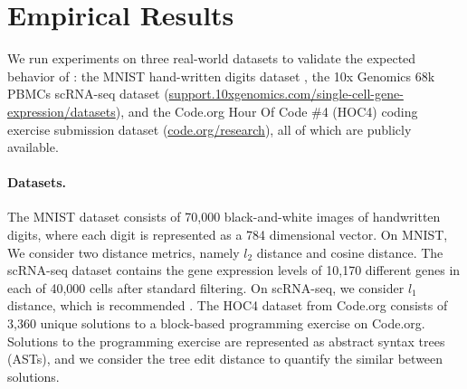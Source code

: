 


\section{Empirical Results \label{sec:exps}}

We run experiments on three real-world datasets to validate the expected behavior of \algnamenospace: the MNIST hand-written digits dataset \cite{lecun1998gradient}, the 10x Genomics 68k PBMCs scRNA-seq dataset \cite{zheng2017massively} (\url{support.10xgenomics.com/single-cell-gene-expression/datasets}), and the Code.org Hour Of Code \#4 (HOC4) coding exercise submission dataset (\url{code.org/research}), all of which are publicly available.

\paragraph{Datasets.} The MNIST dataset \cite{lecun1998gradient} consists of 70,000 black-and-white images of handwritten digits, where each digit is represented as a 784 dimensional vector. On MNIST, We consider two distance metrics, namely $l_2$ distance and cosine distance.
The scRNA-seq dataset contains the gene expression levels of 10,170 different genes in each of 40,000 cells after standard filtering. On scRNA-seq, we consider $l_1$ distance, which is recommended \cite{ntranos2016fast}.
The HOC4 dataset from Code.org \cite{hoc4dataset} consists of 3,360 unique solutions to a block-based programming exercise on Code.org. Solutions to the programming exercise are represented as abstract syntax trees (ASTs), and we consider the tree edit distance to quantify the similar between solutions. 

